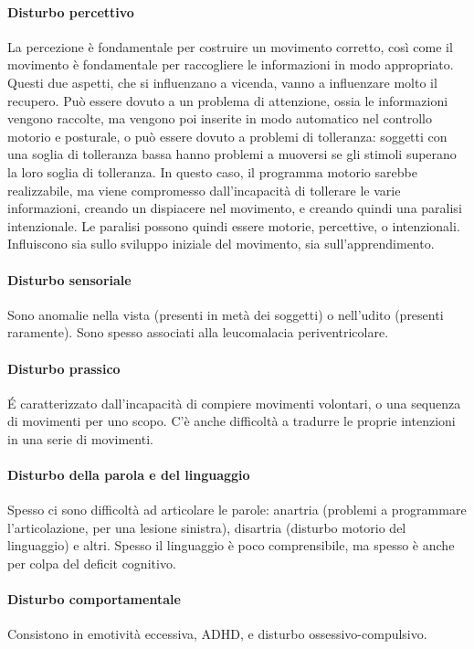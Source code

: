 \paragraph{Disturbo percettivo}
La percezione è fondamentale per costruire un movimento corretto, così come il movimento è fondamentale per raccogliere le informazioni
in modo appropriato. Questi due aspetti, che si influenzano a vicenda, vanno a influenzare molto il recupero. Può essere dovuto a un
problema di attenzione, ossia le informazioni vengono raccolte, ma vengono poi inserite in modo automatico nel controllo motorio e
posturale, o può essere dovuto a problemi di tolleranza: soggetti con una soglia di tolleranza bassa hanno problemi a muoversi se gli
stimoli superano la loro soglia di tolleranza. In questo caso, il programma motorio sarebbe realizzabile, ma viene compromesso
dall'incapacità di tollerare le varie informazioni, creando un dispiacere nel movimento, e creando quindi una paralisi intenzionale. Le
paralisi possono quindi essere motorie, percettive, o intenzionali. Influiscono sia sullo sviluppo iniziale del movimento, sia
sull'apprendimento.

\paragraph{Disturbo sensoriale}
Sono anomalie nella vista (presenti in metà dei soggetti) o nell'udito (presenti raramente). Sono spesso associati alla leucomalacia
periventricolare.

\paragraph{Disturbo prassico}
\'E caratterizzato dall'incapacità di compiere movimenti volontari, o una sequenza di movimenti per uno scopo. C'è anche difficoltà a
tradurre le proprie intenzioni in una serie di movimenti. 

\paragraph{Disturbo della parola e del linguaggio}
Spesso ci sono difficoltà ad articolare le parole: anartria (problemi a programmare l'articolazione, per una lesione sinistra),
disartria (disturbo motorio del linguaggio) e altri. Spesso il linguaggio è poco comprensibile, ma spesso è anche per colpa del deficit
cognitivo. 

\paragraph{Disturbo comportamentale}
Consistono in emotività eccessiva, ADHD, e disturbo ossessivo-compulsivo.

